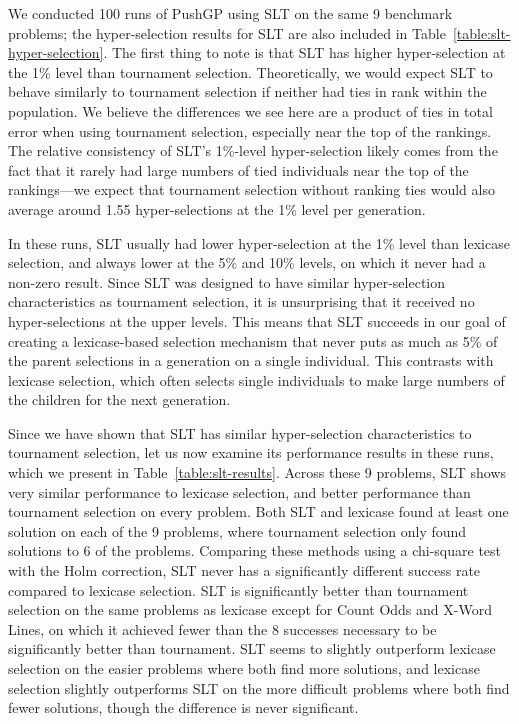 \documentclass{sig-alternate}
\begin{document}
We conducted 100 runs of PushGP using SLT on the same 9 benchmark problems; the hyper-selection results for SLT are also included in Table~\ref{table:slt-hyper-selection}. The first thing to note is that SLT has higher hyper-selection at the 1\% level than tournament selection. Theoretically, we would expect SLT to behave similarly to tournament selection if neither had ties in rank within the population. We believe the differences we see here are a product of ties in total error when using tournament selection, especially near the top of the rankings. The relative consistency of SLT's 1\%-level hyper-selection likely comes from the fact that it rarely had large numbers of tied individuals near the top of the rankings---we expect that tournament selection without ranking ties would also average around 1.55 hyper-selections at the 1\% level per generation.

In these runs, SLT usually had lower hyper-selection at the 1\% level than lexicase selection, and always lower at the 5\% and 10\% levels, on which it never had a non-zero result. Since SLT was designed to have similar hyper-selection characteristics as tournament selection, it is unsurprising that it received no hyper-selections at the upper levels. This means that SLT succeeds in our goal of creating a lexicase-based selection mechanism that never puts as much as 5\% of the parent selections in a generation on a single individual. This contrasts with lexicase selection, which often selects single individuals to make large numbers of the children for the next generation.

Since we have shown that SLT has similar hyper-selection characteristics to tournament selection, let us now examine its performance results in these runs, which we present in Table~\ref{table:slt-results}. Across these 9 problems, SLT shows very similar performance to lexicase selection, and better performance than tournament selection on every problem. Both SLT and lexicase found at least one solution on each of the 9 problems, where tournament selection only found solutions to 6 of the problems. Comparing these methods using a chi-square test with the Holm correction, SLT never has a significantly different success rate compared to lexicase selection. SLT is significantly better than tournament selection on the same problems as lexicase except for Count Odds and X-Word Lines, on which it achieved fewer than the 8 successes necessary to be significantly better than tournament.
 SLT seems to slightly outperform lexicase selection on the easier problems where both find more solutions, and lexicase selection slightly outperforms SLT on the more difficult problems where both find fewer solutions, though the difference is never significant.
\end{document}
